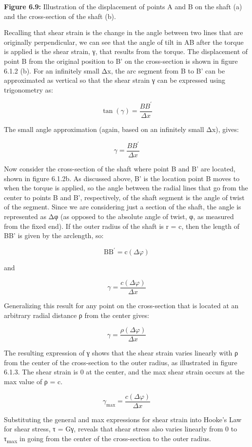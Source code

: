 \documentclass[
  letterpaper,
  DIV=11,
  numbers=noendperiod]{scrreprt}
\begin{document}
\textbf{Figure 6.9:} Illustration of the displacement of points A and B
on the shaft (a) and the cross-section of the shaft (b).

Recalling that shear strain is the change in the angle between two lines
that are originally perpendicular, we can see that the angle of tilt in
AB after the torque is applied is the shear strain, γ, that results from
the torque. The displacement of point B from the original position to B'
on the cross-section is shown in figure 6.1.2 (b). For an infinitely
small Δx, the arc segment from B to B' can be approximated as vertical
so that the shear strain γ can be expressed using trigonometry as:

\[
\tan (\gamma)=\frac{B B^{\prime}}{\Delta x}
\]

The small angle approximation (again, based on an infinitely small Δx),
gives:

\[
\gamma=\frac{B B^{\prime}}{\Delta x}
\]

Now consider the cross-section of the shaft where point B and B' are
located, shown in figure 6.1.2b. As discussed above, B' is the location
point B moves to when the torque is applied, so the angle between the
radial lines that go from the center to points B and B', respectively,
of the shaft segment is the angle of twist of the segment. Since we are
considering just a section of the shaft, the angle is represented as Δφ
(as opposed to the absolute angle of twist, φ, as measured from the
fixed end). If the outer radius of the shaft is r = c, then the length
of BB' is given by the arclength, so:

\[
\mathrm{BB}^{\prime}=\mathrm{c}(\Delta \varphi)
\]

and

\[
\gamma=\frac{c(\Delta \varphi)}{\Delta x}
\]

Generalizing this result for any point on the cross-section that is
located at an arbitrary radial distance ρ from the center gives:

\[
\gamma=\frac{\rho(\Delta \varphi)}{\Delta x}
\]

The resulting expression of γ shows that the shear strain varies
linearly with ρ from the center of the cross-section to the outer
radius, as illustrated in figure 6.1.3. The shear strain is 0 at the
center, and the max shear strain occurs at the max value of ρ = c.

\[
\gamma_{\max }=\frac{c(\Delta \varphi)}{\Delta x}
\]

Substituting the general and max expressions for shear strain into
Hooke's Law for shear stress, τ = Gγ, reveals that shear stress also
varies linearly from 0 to τ\textsubscript{max} in going from the center
of the cross-section to the outer radius.
\end{document}
